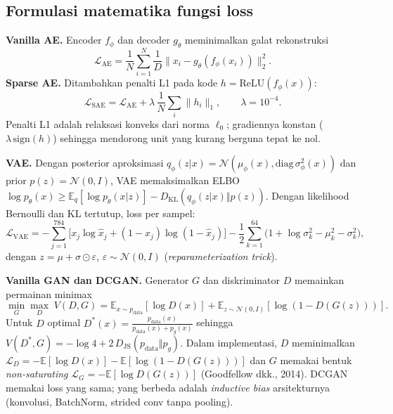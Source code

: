 \subsection{Formulasi matematika fungsi loss}
\textbf{Vanilla AE.} Encoder $f_\phi$ dan decoder $g_\theta$ meminimalkan galat rekonstruksi
\begin{equation}
\mathcal{L}_{\text{AE}}=\frac{1}{N}\sum_{i=1}^{N}\frac{1}{D}\lVert x_i-g_\theta(f_\phi(x_i))\rVert_2^2 .
\end{equation}
\textbf{Sparse AE.} Ditambahkan penalti L1 pada kode $h=\mathrm{ReLU}(f_\phi(x))$:
\begin{equation}
\mathcal{L}_{\text{SAE}}=\mathcal{L}_{\text{AE}}+\lambda\,\frac{1}{N}\sum_i\lVert h_i\rVert_1 ,\qquad \lambda=10^{-4}.
\end{equation}
Penalti L1 adalah relaksasi konveks dari norma $\ell_0$; gradiennya konstan ($\lambda\,\mathrm{sign}(h)$) sehingga
mendorong unit yang kurang berguna tepat ke nol.

\textbf{VAE.} Dengan posterior aproksimasi $q_\phi(z|x)=\mathcal{N}(\mu_\phi(x),\mathrm{diag}\,\sigma^2_\phi(x))$ dan
prior $p(z)=\mathcal{N}(0,I)$, VAE memaksimalkan ELBO $\log p_\theta(x)\ge \mathbb{E}_{q}[\log p_\theta(x|z)]-D_{\text{KL}}(q_\phi(z|x)\Vert p(z))$.
Dengan likelihood Bernoulli dan KL tertutup, loss per sampel:
\begin{equation}
\mathcal{L}_{\text{VAE}}=-\sum_{j=1}^{784}\big[x_j\log\hat{x}_j+(1-x_j)\log(1-\hat{x}_j)\big]
-\frac12\sum_{k=1}^{64}\big(1+\log\sigma_k^2-\mu_k^2-\sigma_k^2\big),
\end{equation}
dengan $z=\mu+\sigma\odot\varepsilon$, $\varepsilon\sim\mathcal{N}(0,I)$ (\emph{reparameterization trick}).

\textbf{Vanilla GAN dan DCGAN.} Generator $G$ dan diskriminator $D$ memainkan permainan minimax
\begin{equation}
\min_G\max_D\;V(D,G)=\mathbb{E}_{x\sim p_{\text{data}}}[\log D(x)]+\mathbb{E}_{z\sim\mathcal{N}(0,I)}[\log(1-D(G(z)))].
\end{equation}
Untuk $D$ optimal $D^*(x)=\frac{p_{\text{data}}(x)}{p_{\text{data}}(x)+p_g(x)}$ sehingga $V(D^*,G)=-\log 4+2\,D_{\text{JS}}(p_{\text{data}}\Vert p_g)$.
Dalam implementasi, $D$ meminimalkan $\mathcal{L}_D=-\mathbb{E}[\log D(x)]-\mathbb{E}[\log(1-D(G(z)))]$ dan $G$ memakai
bentuk \emph{non-saturating} $\mathcal{L}_G=-\mathbb{E}[\log D(G(z))]$ (Goodfellow dkk., 2014). DCGAN memakai loss
yang sama; yang berbeda adalah \emph{inductive bias} arsitekturnya (konvolusi, BatchNorm, strided conv tanpa pooling).

